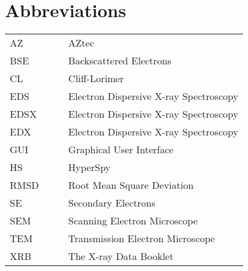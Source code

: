 \chapter*{Abbreviations}

\begin{table}[h!]
    \centering
    \begin{tabular}{llll}
        AZ   &  &  & AZtec                                  \\
        BSE  &  &  & Backscattered Electrons                \\
        CL   &  &  & Cliff-Lorimer                          \\
        EDS  &  &  & Electron Dispersive X-ray Spectroscopy \\
        EDSX &  &  & Electron Dispersive X-ray Spectroscopy \\
        EDX  &  &  & Electron Dispersive X-ray Spectroscopy \\
        GUI  &  &  & Graphical User Interface               \\
        HS   &  &  & HyperSpy                               \\
        RMSD &  &  & Root Mean Square Deviation             \\
        SE   &  &  & Secondary Electrons                    \\
        SEM  &  &  & Scanning Electron Microscope           \\
        TEM  &  &  & Transmission Electron Microscope       \\
        XRB  &  &  & The X-ray Data Booklet
    \end{tabular}
\end{table}

